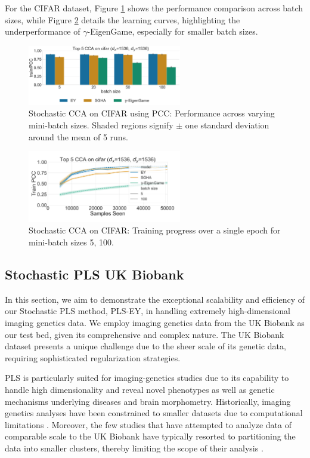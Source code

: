 For the CIFAR dataset, Figure \ref{fig:corr_cifar} shows the performance comparison across batch sizes, while Figure \ref{fig:learningcurve_cifar} details the learning curves, highlighting the underperformance of $\gamma$-EigenGame, especially for smaller batch sizes.

\begin{figure}
    \centering
    \includegraphics[width=0.6\textwidth]{figures/CCA/cifar_models_different_batch_sizes}
    \caption{Stochastic CCA on CIFAR using PCC: Performance across varying mini-batch sizes. Shaded regions signify \(\pm\) one standard deviation around the mean of 5 runs.}
    \label{fig:corr_cifar}
\end{figure}

\begin{figure}
    \centering
    \includegraphics[width=0.6\textwidth]{figures/CCA/cifar_allbatchsizes_pcc}
    \caption{Stochastic CCA on CIFAR: Training progress over a single epoch for mini-batch sizes 5, 100.}
    \label{fig:learningcurve_cifar}
\end{figure}

\subsection{Stochastic PLS UK Biobank}
In this section, we aim to demonstrate the exceptional scalability and efficiency of our Stochastic PLS method, PLS-EY, in handling extremely high-dimensional imaging genetics data. We employ imaging genetics data from the UK Biobank \citep{sudlow2015uk} as our test bed, given its comprehensive and complex nature. The UK Biobank dataset presents a unique challenge due to the sheer scale of its genetic data, requiring sophisticated regularization strategies.

PLS is particularly suited for imaging-genetics studies due to its capability to handle high dimensionality and reveal novel phenotypes as well as genetic mechanisms underlying diseases and brain morphometry. Historically, imaging genetics analyses have been constrained to smaller datasets due to computational limitations \citep{Lorenzi2018,Taquet2021,Lefloch2012}. Moreover, the few studies that have attempted to analyze data of comparable scale to the UK Biobank have typically resorted to partitioning the data into smaller clusters, thereby limiting the scope of their analysis \citep{lorenzi2017secure, altmann2023tackling}.

